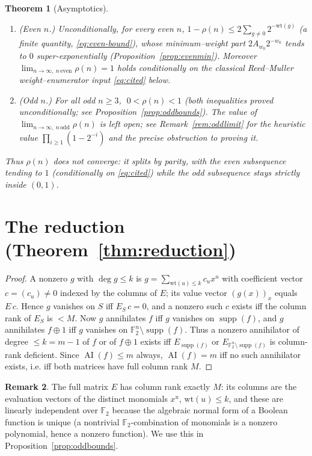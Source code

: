 \documentclass{amsart}
\newtheorem{theorem}{Theorem}
\theoremstyle{definition}
\newtheorem{remark}[theorem]{Remark}
\DeclareMathOperator{\AI}{AI}
\DeclareMathOperator{\supp}{supp}
\newcommand{\F}{\mathbb{F}}
\begin{document}
\begin{theorem}[Asymptotics]\label{thm:asy}
\begin{enumerate}
\item (Even $n$.) Unconditionally, for every even $n$,
      $1-\rho(n)\le 2\sum_{g\ne0}2^{-\mathrm{wt}(g)}$
      (a finite quantity, \eqref{eq:even-bound}), whose minimum--weight
      part $2A_{w_0}2^{-w_0}$ tends to $0$ super-exponentially
      (Proposition~\ref{prop:evenmin}). Moreover
      $\lim_{n\to\infty,\ n\,\mathrm{even}}\rho(n)=1$ holds
      \emph{conditionally} on the classical Reed--Muller
      weight--enumerator input \eqref{eq:cited} below.
\item (Odd $n$.) For all odd $n\ge3$, $\;0<\rho(n)<1$ (both inequalities
      proved unconditionally; see Proposition~\ref{prop:oddbounds}). The
      value of $\lim_{n\to\infty,\ n\,\mathrm{odd}}\rho(n)$ is left
      \emph{open}; see Remark~\ref{rem:oddlimit} for the heuristic value
      $\prod_{i\ge1}(1-2^{-i})$ and the precise obstruction to proving it.
\end{enumerate}
Thus $\rho(n)$ does not converge: it splits by parity, with the even
subsequence tending to $1$ (conditionally on \eqref{eq:cited}) while the
odd subsequence stays strictly inside $(0,1)$.
\end{theorem}

\section{The reduction (Theorem~\ref{thm:reduction})}

\begin{proof}
A nonzero $g$ with $\deg g\le k$ is $g=\sum_{\mathrm{wt}(u)\le k}c_ux^u$
with coefficient vector $c=(c_u)\ne0$ indexed by the columns of $E$; its
value vector $(g(x))_x$ equals $E\,c$. Hence $g$ vanishes on $S$ iff
$E_S\,c=0$, and a nonzero such $c$ exists iff the column rank of $E_S$ is
$<M$. Now $g$ annihilates $f$ iff $g$ vanishes on $\supp(f)$, and $g$
annihilates $f\oplus1$ iff $g$ vanishes on $\F_2^n\setminus\supp(f)$. Thus
a nonzero annihilator of degree $\le k=m-1$ of $f$ or of $f\oplus1$ exists
iff $E_{\supp(f)}$ or $E_{\F_2^n\setminus\supp(f)}$ is column-rank
deficient. Since $\AI(f)\le m$ always, $\AI(f)=m$ iff no such annihilator
exists, i.e. iff both matrices have full column rank $M$.
\end{proof}

\begin{remark}\label{rem:fullrank}
The full matrix $E$ has column rank exactly $M$: its columns are the
evaluation vectors of the distinct monomials $x^u$, $\mathrm{wt}(u)\le k$,
and these are linearly independent over $\F_2$ because the algebraic normal
form of a Boolean function is unique (a nontrivial $\F_2$-combination of
monomials is a nonzero polynomial, hence a nonzero function). We use this
in Proposition~\ref{prop:oddbounds}.
\end{remark}
\end{document}

